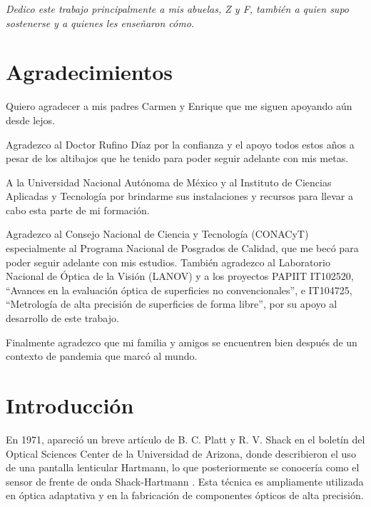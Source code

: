 \documentclass[letterpaper,12pt,oneside]{book}
\begin{document}
\clearpage
\thispagestyle{empty}
\null
\vfill
\begin{flushright}
	\emph{Dedico este trabajo principalmente a mis abuelas, Z y F, también a quien supo sostenerse y a quienes les enseñaron cómo.}
\end{flushright}
\vfill
\null
\clearpage

\chapter*{Agradecimientos}

Quiero agradecer a mis padres Carmen y Enrique que me siguen apoyando aún desde lejos.

Agradezco al Doctor Rufino Díaz por la confianza y el apoyo todos estos años a pesar de
los altibajos que he tenido para poder seguir adelante con mis metas.

A la Universidad Nacional Autónoma de México y al Instituto de Ciencias Aplicadas y
Tecnología por brindarme sus instalaciones y recursos para llevar a cabo esta parte de mi
formación.

Agradezco al Consejo Nacional de Ciencia y Tecnología (CONACyT) especialmente al Programa
Nacional de Posgrados de Calidad, que me becó para poder seguir adelante con mis estudios.
También agradezco al Laboratorio Nacional de Óptica de la Visión (LANOV) y a los
proyectos PAPIIT IT102520, ``Avances en la evaluación óptica de superficies no
convencionales'', e IT104725, ``Metrología de alta precisión de superficies de forma
libre'', por su apoyo al desarrollo de este trabajo.

Finalmente agradezco que mi familia y amigos se encuentren bien después de un contexto de
pandemia que marcó al mundo.

 	\tableofcontents

\chapter{Introducción} 

En 1971, apareció un breve artículo de B. C. Platt y R. V. Shack \cite{Shack} en el
boletín del Optical Sciences Center de la Universidad de Arizona, donde describieron el
uso de una pantalla lenticular Hartmann, lo que posteriormente se conocería como el sensor
de frente de onda Shack-Hartmann \cite{PlattShack,Tyson}. Esta técnica es ampliamente
utilizada en óptica adaptativa y en la fabricación de componentes ópticos de alta
precisión.
\end{document}
